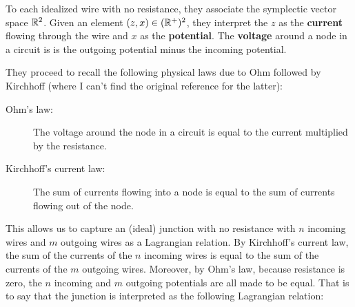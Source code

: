 To each idealized wire with no resistance, they associate the symplectic vector space $\mathbb{R}^{2}$.  Given an element $(z,x) \in (\mathbb{R}^+)^2$,  they interpret the $z$ as the {\bf current} flowing through the wire and $x$ as the {\bf potential}. The {\bf voltage} around a node in a circuit is is the outgoing potential minus the incoming potential.

They proceed to recall the following physical laws due to Ohm \cite{ohm} followed by Kirchhoff (where I can't find the original reference for the latter):
\begin{description}
\item[Ohm's law:]  The voltage around the node in a circuit is equal to the current multiplied by the resistance.
\item[Kirchhoff's current law:] The sum of currents flowing into a node is equal to the sum of currents flowing out of the node.
\end{description}
This allows us to capture an (ideal) junction with no resistance with $n$ incoming wires and $m$ outgoing wires as a Lagrangian relation.  By Kirchhoff's current law, the sum of the currents of the $n$ incoming wires is equal to the sum of the currents of the $m$ outgoing wires.  Moreover, by Ohm's law, because resistance is zero, the $n$ incoming and $m$ outgoing potentials are all made to be equal.  That is to say that the junction is interpreted as the following Lagrangian relation:
